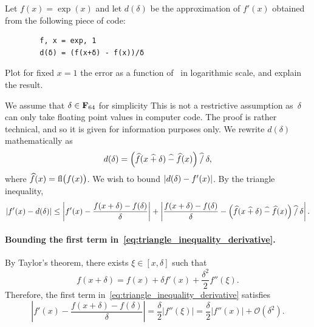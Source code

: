 \begin{compexercise}
    Let $f(x) = \exp(x)$ and let $d(\delta)$ be the approximation of $f'(x)$ obtained from the following piece of code:
    \begin{verbatim}
        f, x = exp, 1
        d(δ) = (f(x+δ) - f(x))/δ
    \end{verbatim}
    Plot for fixed $x = 1$ the error  as a function of~ in logarithmic scale,
    and explain the result.
\end{compexercise}
\begin{solution}
    We assume that $\delta \in \mathbf F_{64}$ for simplicity
    This is not a restrictive assumption
    as~$\delta$ can only take floating point values in computer code.
    The proof is rather technical, and so it is given for information purposes only.
    We rewrite $d(\delta)$ mathematically as
    \[
        d(\delta) = \Bigl(\widehat f(x \mathbin{\widehat +} \delta) \mathbin{\widehat -} \widehat f(x)\Bigr) \mathbin{\widehat /} \delta,
    \]
    where $\widehat f(x) = {\rm fl} \bigl(f(x)\bigr)$.
    We wish to bound $\lvert d(\delta) - f'(x)\rvert$.
    By the triangle inequality,
    \begin{equation}
        \label{eq:triangle_inequality_derivative}
        \lvert f'(x) - d(\delta)\rvert
        \leq \left\lvert f'(x) - \frac{f(x + \delta) - f(\delta)}{\delta} \right\rvert
        + \left\lvert \frac{f(x + \delta) - f(\delta)}{\delta} - \Bigl(\widehat f(x \mathbin{\widehat +} \delta) \mathbin{\widehat -} \widehat f(x)\Bigr) \mathbin{\widehat /} \delta \right\rvert.
    \end{equation}
    \paragraph{Bounding the first term in~\eqref{eq:triangle_inequality_derivative}.}
    By Taylor's theorem, there exists $\xi \in [x, \delta]$ such that
    \[
        f(x + \delta) = f(x) + \delta f'(x) + \frac{\delta^2}{2} f''(\xi).
    \]
    Therefore, the first term in~\eqref{eq:triangle_inequality_derivative} satisfies
    \[
        \left\lvert f'(x) - \frac{f(x + \delta) - f(\delta)}{\delta} \right\rvert
        = \frac{\delta}{2} \lvert f''(\xi) \rvert
        = \frac{\delta}{2} \lvert f''(x) \rvert + \mathcal O(\delta^2).
    \]


\end{solution}
